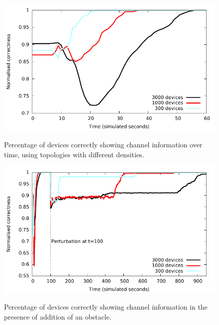 \documentclass[12pt,a4paper,twoside,openright]{book}
\begin{document}
\begin{figure}
\begin{center}{\includegraphics[width=\textwidth]{img/quality}}\end{center}
\caption[Devices correctly building the channel]{Percentage of devices correctly showing channel information over time, using topologies with different densities.}
\label{f:london2}
\end{figure}

\begin{figure}
\begin{center}{\includegraphics[width=\textwidth]{img/addobstacle}}\end{center}
\caption[Devices correctly building the channel, with a new obstacle]{Percentage of devices correctly showing channel information in the presence of addition of an obstacle.}
\label{f:london3}
\end{figure}
\end{document}
